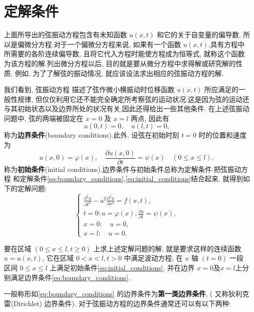 \section{定解条件}

上面所导出的弦振动方程包含有未知函数 $u(x, t)$ 和它的关于自变量的偏导数, 
所以是偏微分方程.对于一个偏微分方程来说, 如果有一个函数 $u(x, t)$,具有方程中所需要的各阶连续偏导数, 
且将它代入方程时能使方程成为恒等式, 就称这个函数为该方程的解.列出微分方程以后, 目的就是要从微分方程中求得解或研究解的性质.
例如, 为了了解弦的振动情况, 就应该设法求出相应的弦振动方程的解.

我们看到, 弦振动方程 描述了弦作微小横振动时位移函数 $u(x, t)$ 所应满足的一般性规律, 
但仅仅利用它还不能完全确定所考察弦的运动状况.这是因为弦的运动还与其初始状态以及边界所处的状况有关,因此还得给出一些其他条件.
在上述弦振动问题中, 弦的两端被固定在 $x=0$ 及 $x=l$ 两点, 因此有
\begin{equation}
    u(0, t)=0, \quad u(l, t)=0,
    \label{eq:boundary_conditions}
\end{equation}
称为\textbf{边界条件}(boundary conditions).此外, 设弦在初始时刻 $t=0$ 时的位置和速度为
\begin{equation}
    u(x, 0)=\varphi(x), \quad \frac{\partial u(x, 0)}{\partial t}=\psi(x) \quad(0 \leqslant x \leqslant l),
    \label{eq:initial_conditions}
\end{equation}
称为\textbf{初始条件}(initial conditions).边界条件与初始条件总称为定解条件.把弦振动方程 
和定解条件\eqref{eq:boundary_conditions},\eqref{eq:initial_conditions}结合起来, 就得到如下的定解问题:
$$
\left\{\begin{array}{l}
	\frac{\partial^2 u}{\partial t^2}-a^2 \frac{\partial^2 u}{\partial x^2}=f(x, t), \\
	t=0: u=\varphi(x), \frac{\partial u}{\partial t}=\psi(x), \\
	x=0: \quad u=0, \\
	x=l: \quad u=0 .
\end{array}\right.
$$

要在区域 $(0 \leqslant x \leqslant l, t \geqslant 0)$ 上求上述定解问题的解, 
就是要求这样的连续函数 $u=u(x, t)$, 它在区域 $0<x<l, t>0$ 中满足波动方程; 
在 $x$ 轴 $(t=0)$ 一段区间 $0 \leqslant x \leqslant l$ 上满足初始条件\eqref{eq:initial_conditions},
 并在边界 $x=0$及$x=l$上分别满足边界条件\eqref{eq:boundary_conditions}.

一般称形如\eqref{eq:boundary_conditions} 的边界条件为\textbf{第一类边界条件}, ( 又称狄利克雷(Dirichlet) 边界条件).
对于弦振动方程的边界条件通常还可以有以下两种:

